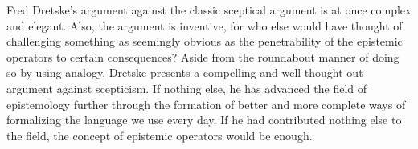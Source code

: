 \documentclass[12pt,letterpaper]{report}
\begin{document}
Fred Dretske's argument against the classic sceptical argument is at once complex and elegant. Also, the argument is inventive, for who else would have thought of challenging something as seemingly obvious as the penetrability of the epistemic operators to certain consequences? Aside from the roundabout manner of doing so by using analogy, Dretske presents a compelling and well thought out argument against scepticism. If nothing else, he has advanced the field of epistemology further through the formation of better and more complete ways of formalizing the language we use every day. If he had contributed nothing else to the field, the concept of epistemic operators would be enough.
\end{document}

